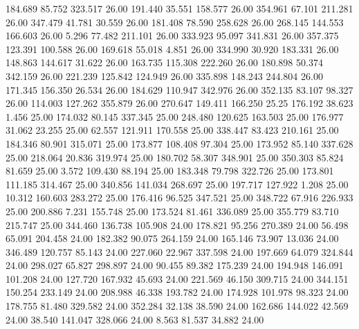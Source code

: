  184.689   85.752  323.517        26.00
 191.440   35.551  158.577        26.00
 354.961   67.101  211.281        26.00
 347.479   41.781   30.559        26.00
 181.408   78.590  258.628        26.00
 268.145  144.553  166.603        26.00
   5.296   77.482  211.101        26.00
 333.923   95.097  341.831        26.00
 357.375  123.391  100.588        26.00
 169.618   55.018    4.851        26.00
 334.990   30.920  183.331        26.00
 148.863  144.617   31.622        26.00
 163.735  115.308  222.260        26.00
 180.898   50.374  342.159        26.00
 221.239  125.842  124.949        26.00
 335.898  148.243  244.804        26.00
 171.345  156.350   26.534        26.00
 184.629  110.947  342.976        26.00
 352.135   83.107   98.327        26.00
 114.003  127.262  355.879        26.00
 270.647  149.411  166.250        25.25
 176.192   38.623    1.456        25.00
 174.032   80.145  337.345        25.00
 248.480  120.625  163.503        25.00
 176.977   31.062   23.255        25.00
  62.557  121.911  170.558        25.00
 338.447   83.423  210.161        25.00
 184.346   80.901  315.071        25.00
 173.877  108.408   97.304        25.00
 173.952   85.140  337.628        25.00
 218.064   20.836  319.974        25.00
 180.702   58.307  348.901        25.00
 350.303   85.824   81.659        25.00
   3.572  109.430   88.194        25.00
 183.348   79.798  322.726        25.00
 173.801  111.185  314.467        25.00
 340.856  141.034  268.697        25.00
 197.717  127.922    1.208        25.00
  10.312  160.603  283.272        25.00
 176.416   96.525  347.521        25.00
 348.722   67.916  226.933        25.00
 200.886    7.231  155.748        25.00
 173.524   81.461  336.089        25.00
 355.779   83.710  215.747        25.00
 344.460  136.738  105.908        24.00
 178.821   95.256  270.389        24.00
  56.498   65.091  204.458        24.00
 182.382   90.075  264.159        24.00
 165.146   73.907   13.036        24.00
 346.489  120.757   85.143        24.00
 227.060   22.967  337.598        24.00
 197.669   64.079  324.844        24.00
 298.027   65.827  298.897        24.00
  90.455   89.382  175.239        24.00
 194.948  146.091  101.208        24.00
 127.720  167.932   45.693        24.00
 221.569   46.150  309.715        24.00
 344.151  150.254  233.149        24.00
 208.988   46.338  193.782        24.00
 174.928  101.978   98.323        24.00
 178.755   81.480  329.582        24.00
 352.284   32.138   38.590        24.00
 162.686  144.022   42.569        24.00
  38.540  141.047  328.066        24.00
   8.563   81.537   34.882        24.00
